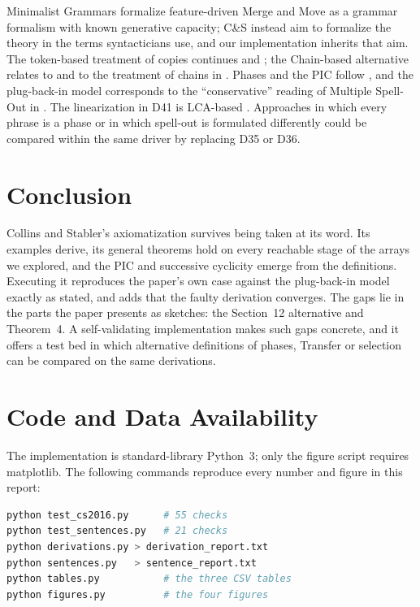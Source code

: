 \documentclass[11pt]{article}
\newcommand{\Def}[1]{D#1}
\theoremstyle{definition}
\theoremstyle{plain}
\begin{document}
Minimalist Grammars \citep{Stabler1997,Stabler2011} formalize feature-driven
Merge and Move as a grammar formalism with known generative capacity; C\&S
instead aim to formalize the theory in the terms syntacticians use, and our
implementation inherits that aim. The token-based treatment of copies
continues \citet{Collins1997,Collins2002} and \citet{Gartner2002}; the
Chain-based alternative relates to \citet{Kracht2001} and to the treatment
of chains in \citet{Nunes2004}. Phases and the PIC follow
\citet{Chomsky2000,Chomsky2004}, and the plug-back-in model corresponds to
the ``conservative'' reading of Multiple Spell-Out in \citet{Uriagereka1999}.
The linearization in \Def{41} is LCA-based \citep{Kayne1994}. Approaches in
which every phrase is a phase \citep{Muller2010} or in which spell-out is
formulated differently \citep{EpsteinSeely2006} could be compared within the
same driver by replacing \Def{35} or \Def{36}.

\section{Conclusion}
\label{sec:conclusion}

Collins and Stabler's axiomatization survives being taken at its word. Its
examples derive, its general theorems hold on every reachable stage of the
arrays we explored, and the PIC and successive cyclicity emerge from the
definitions. Executing it reproduces the paper's own case against the
plug-back-in model exactly as stated, and adds that the faulty derivation
converges. The gaps lie in the parts the paper presents as sketches: the
Section~12 alternative and Theorem~4. A self-validating implementation makes
such gaps concrete, and it offers a test bed in which alternative definitions
of phases, Transfer or selection can be compared on the same derivations.

\section*{Code and Data Availability}

The implementation is standard-library Python~3; only the figure script
requires matplotlib. The following commands reproduce every number and
figure in this report:

\begin{lstlisting}[language=bash]
python test_cs2016.py      # 55 checks
python test_sentences.py   # 21 checks
python derivations.py > derivation_report.txt
python sentences.py   > sentence_report.txt
python tables.py           # the three CSV tables
python figures.py          # the four figures
\end{lstlisting}
\end{document}
